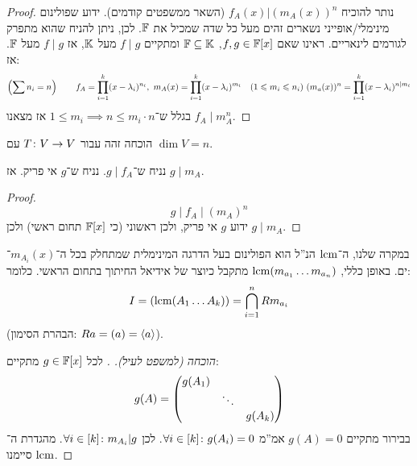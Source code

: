 \documentclass[name=רשימות אלגברה לינארית 2א]{../../../tex/classes/megasumPreamble}
\begin{document}
	\begin{proof}
		נותר להוכיח $f_A(x) | (m_A(x))^{n}$ (השאר ממשפטים קודמים). ידוע שפולינום מינימלי/אופייני נשארים זהים מעל כל שדה שמכיל את $\mathbb{F}$. לכן, ניתן להניח שהוא מתפרק לגורמים לינאריים. ראינו שאם $f, g \in \mathbb{F}[x]$, $\mathbb{F} \subseteq \mathbb{K}$ ומתקיים $f \mid g$ מעל $\mathbb{K}$, אז $f \mid g$ מעל $\mathbb{F}$. אז: 
		\[ \left ( \sum n_i = n \right ) \quad\quad f_A = \prod_{i = 1}^{k}(x - \lambda_i)^{n_i}, \ m_A(x) = \prod_{i = 1}^{k}(x - \lambda_i)^{m_i} \quad (1 \leqslant m_i \leqslant n_i) \ (m_a(x))^{n} = \prod_{i = 1}^{k}(x - \lambda_i)^{n \mid m_i} \]
		בגלל ש־$1 \le m_i \implies n \le m_i \cdot n$ אז מצאנו $f_A\mid m_A^{n}$. 
	\end{proof}
	הוכחה זהה עבור $T \colon V \to V$ עם $\dim V = n$. 
	\begin{Collary}[שימושית!]
		נניח ש־$g \mid f_A$. נניח ש־$g$ אי פריק. אז $g \mid m_A$. 
	\end{Collary}\begin{proof}
		\[ g \mid f_A \mid (m_A)^{n} \]
		ידוע $g$ אי פריק, ולכן ראשוני (כי $\mathbb{F}[x]$ תחום ראשי) ולכן $g \mid m_A$. 
	\end{proof}
	במקרה שלנו, ה־$\operatorname{lcm}$ הנ''ל הוא הפולינום בעל הדרגה המינימלית שמתחלק בכל ה־$m_{A_i}(x)$־ים. באופן כללי, $\operatorname{lcm}(m_{a_1} \dots m_{a_n})$ מתקבל כיוצר של אידיאל החיתוך בתחום הראשי. כלומר: 
	\[ I = (\operatorname{lcm}(A_1 \dots A_k)) = \bigcap_{i = 1}^{n}R m_{a_i} \]
	(הבהרת הסימון: $ Ra = (a) = \langle a \rangle $). 
	\begin{proof}[הוכחה (למשפט לעיל). ]
		לכל $g \in \mathbb{F}[x]$ מתקיים: 
		\[ g(A) = \begin{pmatrix} g(A_1) & & \\ & \ddots & \\ && g(A_k) \end{pmatrix} \]
		בבירור מתקיים $g(A) = 0$ אמ''מ $\forall i \in [k] \colon g(A_i) =0$. לכן $\forall i \in [k] \colon m_{A_i} | g$. מהגדרת ה־$\operatorname{lcm}$ סיימנו. 
	\end{proof}
	
\end{document}
